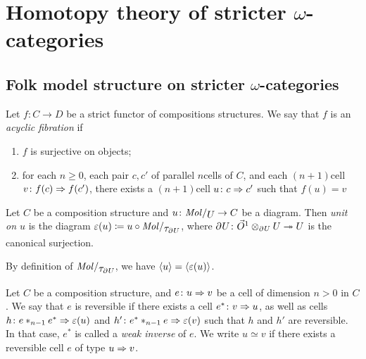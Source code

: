 \section{Homotopy theory of stricter \texorpdfstring{$\omega$}{ω}-categories}

\subsection{Folk model structure on stricter \texorpdfstring{$\omega$}{ω}-categories}

\begin{dfn}  \label{dfn:acyclic_fibration} 
    Let \( f \colon C \to D \) be a strict functor of compositions structures.
    We say that \( f \) is an \emph{acyclic fibration} if
    \begin{enumerate}
        \item \( f \) is surjective on objects;
        \item for each \( n \geq 0 \), each pair \( c, c' \) of parallel \( n \)\nbd cells of \( C \), and each \( (n + 1) \)\nbd cell \( v \colon f(c) \Rightarrow f(c') \), there exists a \( (n + 1) \)\nbd cell \( u \colon c \Rightarrow c' \) such that \( f(u) = v \)
    \end{enumerate}
\end{dfn}

\begin{dfn} 
    Let \( C \) be a composition structure and \( u \colon \molecin{U} \to C \) be a diagram.
    Then \emph{unit on \( u \)} is the diagram \( \un(u) \eqdef u \after \molecin{\tau_{\bd{}{} U}} \), where \( \partial_{}^{} U \colon \vec{O}^{1} \otimes_{\partial_{}^{} U} U \twoheadrightarrow U \) is the canonical surjection.
\end{dfn}

\begin{rmk}
    By definition of \( \molecin{\tau_{{\bd{}{} U}}} \), we have \( \langle u\rangle = \langle\varepsilon(u)\rangle \).
\end{rmk}

\begin{dfn}  
    Let \( C \) be a composition structure, and \( e \colon u \Rightarrow v \) be a cell of dimension \( n > 0 \) in \( C \).
    We say that \( e \) is reversible if there exists a cell \( e^* \colon v \Rightarrow u \), as well as cells \( h \colon e *_{n - 1} e^* \Rightarrow \varepsilon(u) \) and \( h' \colon e^* *_{n - 1} e \Rightarrow \varepsilon(v) \) such that \( h \) and \( h' \) are reversible.
    In that case, \( e^* \) is called a \emph{weak inverse} of \( e \).
    We write \( u \simeq v \) if there exists a reversible cell \( e \) of type \( u \Rightarrow v \).
\end{dfn}

